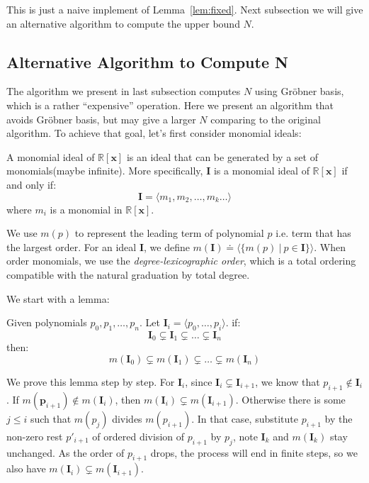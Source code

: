 \documentclass{jssc}
\begin{document}
This is just a naive implement of Lemma~\ref{lem:fixed}. Next subsection we will give an alternative algorithm to compute the upper bound $N$.

\subsection{Alternative Algorithm to Compute N}
\label{sub:alternative}
The algorithm we present in last subsection computes $N$ using Gr\"{o}bner basis, which is a rather ``expensive'' operation. Here we present an algorithm that avoids Gr\"{o}bner basis, but may give a larger $N$ comparing to the original algorithm. To achieve that goal, let's first consider monomial ideals:

\begin{definition}
\label{def:monomialIdeal}
A monomial ideal of $\mathbb{R}[\boldsymbol{x}]$ is an ideal that can be generated by a set of monomials(maybe infinite). More specifically, $\boldsymbol{I}$ is a monomial ideal of $\mathbb{R}[\boldsymbol{x}]$ if and only if:
\begin{displaymath}
	\boldsymbol{I} = \langle m_1, m_2, \dots, m_k \dots \rangle
\end{displaymath}
where $m_i$ is a monomial in $\mathbb{R}[\boldsymbol{x}]$.
\end{definition}

We use $m(p)$ to represent the leading term of polynomial $p$ i.e. term that has the largest order. For an ideal $\boldsymbol{I}$, we define $m(\boldsymbol{I}) \doteq \langle \{m(p)\ |\ p \in \boldsymbol{I} \} \rangle$. When order monomials, we use the \emph{degree-lexicographic order}, which is a total ordering compatible with the natural graduation by total degree.

We start with a lemma:

\begin{lemma}
\label{lem:monomialChain}
Given polynomials $p_0, p_1, \dots, p_n$. Let $\boldsymbol{I}_i = \langle p_0, \dots, p_i \rangle$. if:
	\begin{equation*}
		\boldsymbol{I}_0 \subsetneq \boldsymbol{I}_1 \subsetneq \dots \subsetneq \boldsymbol{I}_n
	\end{equation*}
then:
	\begin{equation*}
		m(\boldsymbol{I}_0) \subsetneq m(\boldsymbol{I}_1) \subsetneq \dots \subsetneq m(\boldsymbol{I}_n)
	\end{equation*}
\end{lemma}

\proof
We prove this lemma step by step. For $\boldsymbol{I}_i$, since $\boldsymbol{I}_i \subsetneq \boldsymbol{I}_{i+1}$, we know that $p_{i+1} \notin \boldsymbol{I}_i$. If $m(\boldsymbol{p}_{i+1}) \notin m(\boldsymbol{I}_i)$, then $m(\boldsymbol{I}_i) \subsetneq m(\boldsymbol{I}_{i+1})$. Otherwise there is some $j \leq i$ such that $m(p_j)$ divides $m(p_{i+1})$. In that case, substitute $p_{i+1}$ by the non-zero rest $p'_{i+1}$ of ordered division of $p_{i+1}$ by $p_j$, note $\boldsymbol{I}_k$ and $m(\boldsymbol{I}_k)$ stay unchanged. As the order of $p_{i+1}$ drops, the process will end in finite steps, so we also have $m(\boldsymbol{I}_i) \subsetneq m(\boldsymbol{I}_{i+1})$.
\end{document}
